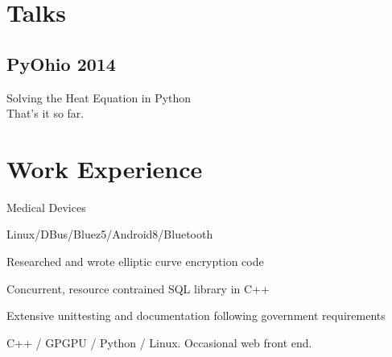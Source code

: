 \documentclass[]{deedy-resume-openfont}
\begin{document}
\begin{minipage}[t]{0.33\textwidth}
    \section{Talks}
    \subsection{PyOhio 2014}
    Solving the Heat Equation in Python \\
    That's it so far.

    \sectionsep


\end{minipage} 
\hfill
\begin{minipage}[t]{0.66\textwidth} 


    \section{Work Experience}

    \vspace{\topsep} %
    \begin{tightemize}
    \item Medical Devices
    \item Linux/DBus/Bluez5/Android8/Bluetooth
    \item Researched and wrote elliptic curve encryption code
    \item Concurrent, resource contrained SQL library in C++
    \item Extensive unittesting and documentation following government requirements
    \end{tightemize}
    \sectionsep

    \begin{tightemize}
    \item C++ / GPGPU / Python / Linux. Occasional web front end.
    \end{tightemize}
    \sectionsep


\end{minipage}
\end{document}
